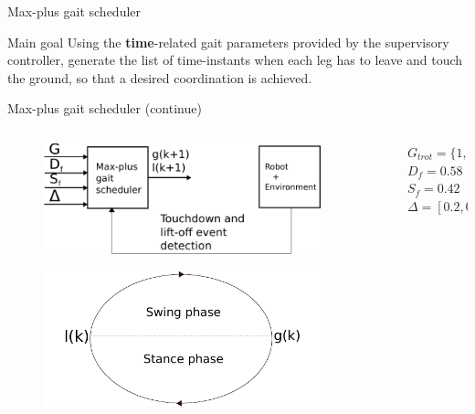 \documentclass{beamer}
\begin{document}
\begin{frame}{Max-plus gait scheduler}
	\begin{block}{Main goal}
		\Large Using the \textbf{time}-related gait parameters provided by the supervisory controller, generate the list of time-instants when each leg has to leave and touch the ground, so that a desired coordination is achieved.
	\end{block}
\end{frame}

\begin{frame}{Max-plus gait scheduler (continue)}
\begin{columns}
\hspace{1cm}
\begin{column}{0.45\textwidth}
	\begin{figure}[ht]\centering
		\includegraphics[width=0.9\textwidth]{images/MaxPlus.pdf}
	\end{figure}
	\begin{figure}[ht]\centering
		\includegraphics[width=0.9\textwidth]{images/Phases.pdf}
	\end{figure}
\end{column}
\begin{column}{0.55\textwidth}
$G_{trot}=\{1,4\}\prec\{2,3\}$ \\
$D_f = 0.58$ \\
$S_f = 0.42$ \\
$\Delta = [0.2,0.2]$ 


\end{column}
\end{columns}
\end{frame}
\end{document}
